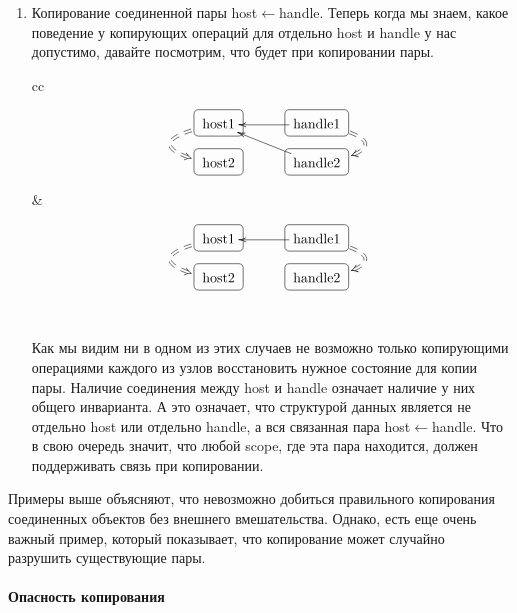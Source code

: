 \begin{enumerate}
\item Копирование соединенной пары host$\leftarrow$handle.
Теперь когда мы знаем, какое поведение у копирующих операций для отдельно host и handle у нас допустимо, давайте посмотрим, что будет при копировании пары.
\begin{center}
\begin{tabular}{cc}
{
\begin{minipage}[\baselineskip]{5.5cm}
\[
\xymatrix@R=15pt@C=15pt{
  {\text{host1}}\ar@{==>}@/_30pt/[d]<-5pt>
      	{
	\save
   [].[]*+[F-:<3pt>]\frm{}
   \restore
	}
  &{}&{\text{handle1}}\ar[ll]\ar@{==>}@/^30pt/[d]<5pt>
    	{
	\save
   [].[]*+[F-:<3pt>]\frm{}
   \restore
	}
  \\
  {\text{host2}}
        	{
	\save
   [].[]*+[F-:<3pt>]\frm{}
   \restore
	}
  &{}&{\text{handle2}}\ar[llu]
    	{
	\save
   [].[]*+[F-:<3pt>]\frm{}
   \restore
	}
  \\ 
}
\]
\end{minipage}
}&{
\begin{minipage}[\baselineskip]{5.5cm}
\[
\xymatrix@R=15pt@C=15pt{
  {\text{host1}}\ar@{==>}@/_30pt/[d]<-5pt>
      	{
	\save
   [].[]*+[F-:<3pt>]\frm{}
   \restore
	}
  &{}&{\text{handle1}}\ar[ll]\ar@{==>}@/^30pt/[d]<5pt>
    	{
	\save
   [].[]*+[F-:<3pt>]\frm{}
   \restore
	}
  \\ 
  {\text{host2}}
        	{
	\save
   [].[]*+[F-:<3pt>]\frm{}
   \restore
	}
  &{}&{\text{handle2}}
    	{
	\save
   [].[]*+[F-:<3pt>]\frm{}
   \restore
	}
  \\ 
}
\]
\end{minipage}
}\\
\end{tabular}
\end{center}
Как мы видим ни в одном из этих случаев не возможно только копирующими операциями каждого из узлов восстановить нужное состояние для копии пары.
Наличие соединения между host и handle означает наличие у них общего инварианта.
А это означает, что структурой данных является не отдельно host или отдельно handle, а вся связанная пара host$\leftarrow$handle.
Что в свою очередь значит, что любой scope, где эта пара находится, должен поддерживать связь при копировании.
\end{enumerate}
Примеры выше объясняют, что невозможно добиться правильного копирования соединенных объектов без внешнего вмешательства.
Однако, есть еще очень важный пример, который показывает, что копирование может случайно разрушить существующие пары.

\paragraph{Опасность копирования}

